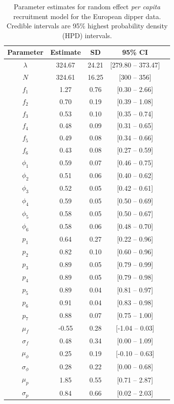 \documentclass[12pt]{article}
\begin{document}


\clearpage


\begin{table}
    \caption{Parameter estimates for random effect {\it per capita} recruitment model for the European dipper data. Credible intervals are 95\% highest probability density (HPD) intervals.} \bigskip
    \label{tab:dipper}
    \centering
    \begin{tabular}{ccccc}
        \hline\hline
        Parameter & Estimate &  SD & 95\% CI \\
        \hline
        $\lambda$ & 324.67 & 24.21 & [279.80 -- 373.47]  \\
        $N$ & 324.61 & 16.25 & [300 -- 356]  \\
        \hline
        $f_1$ & 1.27 & 0.76 & [0.30 -- 2.66]  \\
         $f_2$ & 0.70  & 0.19 &  [0.39 -- 1.08]  \\
         $f_3$ & 0.53  & 0.10 &  [0.35 -- 0.74]  \\
         $f_4$ & 0.48  & 0.09 &  [0.31 -- 0.65]  \\
         $f_5$ & 0.49  & 0.08 &  [0.34 -- 0.66]  \\
         $f_6$ & 0.43  & 0.08 &  [0.27 -- 0.59]  \\
         \hline
         $\phi_1$ & 0.59 & 0.07 &  [0.46 -- 0.75]  \\
         $\phi_2$ & 0.51 & 0.06 &  [0.40 -- 0.62]  \\
         $\phi_3$ & 0.52 & 0.05 &  [0.42 -- 0.61]  \\
         $\phi_4$ & 0.59 & 0.05 &  [0.50 -- 0.69]  \\
         $\phi_5$ & 0.58 & 0.05 &  [0.50 -- 0.67]  \\
         $\phi_6$ &  0.58 & 0.06 &  [0.48 -- 0.70]  \\
         \hline
         $p_1$ & 0.64 & 0.27 &  [0.22 -- 0.96]  \\
         $p_2$ & 0.82 & 0.10 &  [0.60 -- 0.96]  \\
         $p_3$ & 0.89 & 0.05 &  [0.79 -- 0.99]  \\
         $p_4$ & 0.89 & 0.05 &  [0.79 -- 0.98]  \\
         $p_5$ & 0.89 & 0.04 &  [0.81 -- 0.97]  \\
         $p_6$ & 0.91 & 0.04 & [0.83 -- 0.98]   \\
         $p_7$ & 0.88 & 0.07 &  [0.75 -- 1.00]  \\
         \hline
         $\mu_f$        & -0.55 & 0.28 &  [-1.04 -- 0.03]  \\
         $\sigma_f $    & 0.48 & 0.34 &  [0.00 -- 1.09]  \\
         $\mu_\phi$     &  0.25 & 0.19 &  [-0.10 -- 0.63]  \\
         $\sigma_\phi $ & 0.28 & 0.22 &  [0.00 -- 0.68]  \\
         $\mu_p$        &  1.85 & 0.55 &  [0.71 -- 2.87]  \\
         $\sigma_p $    & 0.84 & 0.66 &  [0.02 -- 2.03]  \\
         \hline
    \end{tabular}
\end{table}
\end{document}
